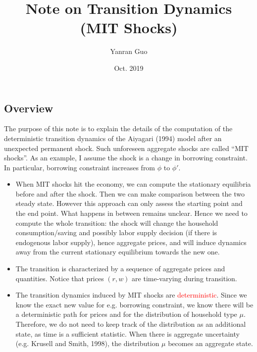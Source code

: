\documentclass{article}
\title{Note on Transition Dynamics\\ (MIT Shocks)}
\author{Yanran Guo}
\date{Oct. 2019}
\begin{document}
\begin{spacing}{1.5}
\maketitle

\section*{Overview}
The purpose of this note is to explain the details of the computation of the deterministic transition dynamics of the Aiyagari (1994) model after an unexpected permanent shock. Such unforeseen aggregate shocks are called ``MIT shocks''. As an example, I assume the shock is a change in borrowing constraint. In particular, borrowing constraint increases from $\phi$ to $\phi'$.

\begin{itemize}
\item When MIT shocks hit the economy, we can compute the stationary equilibria before and after the shock. Then we can make comparison between the two steady state. However this approach can only assess the starting point and the end point. What happens in between remains unclear. Hence we need to compute the whole transition: the shock will change the household consumption/saving and possibly labor supply decision (if there is endogenous labor supply), hence aggregate prices, and will induce dynamics away from the current stationary equilibrium towards the new one.
\item The transition is characterized by a sequence of aggregate prices and quantities. Notice that prices $(r, w)$ are time-varying during transition.
\item The transition dynamics induced by MIT shocks are \textcolor{red}{deterministic}. Since we know the exact new value for e.g. borrowing constraint, we know there will be a deterministic path for prices and for the distribution of household type $\mu$. Therefore, we do not need to keep track of the distribution as an additional state, as time is a sufficient statistic. When there is aggregate uncertainty (e.g. Krusell and Smith, 1998), the distribution $\mu$ becomes an aggregate state.
\end{itemize}
\newpage




\end{spacing}
\end{document}
